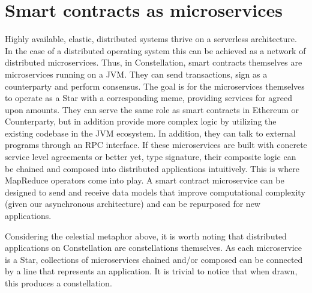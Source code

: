 \documentclass{article}
\begin{document}
\section{Smart contracts as microservices}
Highly available, elastic, distributed systems thrive on a serverless architecture. In the case of a distributed operating system this can be achieved as a network of distributed microservices. Thus, in Constellation, smart contracts themselves are microservices running on a JVM. They can send transactions, sign as a counterparty and perform consensus. The goal is for the microservices themselves to operate as a Star with a corresponding meme, providing services for agreed upon amounts. They can serve the same role as smart contracts in Ethereum or Counterparty, but in addition provide more complex logic by utilizing the existing codebase in the JVM ecosystem. In addition, they can talk to external programs through an RPC interface. If these microservices are built with concrete service level agreements or better yet, type signature, their composite logic can be chained and composed into distributed applications intuitively. This is where MapReduce operators come into play. A smart contract microservice can be designed to send and receive data models that improve computational complexity (given our asynchronous architecture) and can be repurposed for new applications.

Considering the celestial metaphor above, it is worth noting that distributed applications on Constellation are constellations themselves. As each microservice is a  Star, collections of microservices chained and/or composed can be connected by a line that represents an application. It is trivial to notice that when drawn, this produces a constellation.
\end{document}
